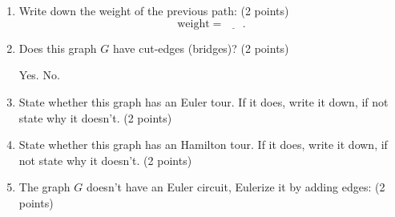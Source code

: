 \documentclass[12pt]{exam}
\begin{document}
\begin{enumerate}
\begin{enumerate}
    \vfill
    \item Write down the weight of the previous path: (2 points)
    \vspace{0.5em}
    $$\text{weight}=\underline{\phantom{ans}}.$$
    \vfill
    \item Does this graph $G$ have cut-edges (bridges)? (2 points)
    \begin{checkboxes}
        \choice Yes.
        \choice No.
    \end{checkboxes}
    \vfill
    \item State whether this graph has an Euler tour. If it does, write it down, if not state why it doesn't. (2 points)
    \vspace{8em}
    \vfill
    \item State whether this graph has an Hamilton tour. If it does, write it down, if not state why it doesn't. (2 points)
    \vspace{8em}
    \vfill
    \newpage
    \item The graph $G$ doesn't have an Euler circuit, Eulerize it by adding edges: (2 points)
    \begin{figure}[h]
        \centering
    
        \begin{tikzpicture}[x=0.75pt,y=0.75pt,yscale=-1,xscale=1]
        

\end{tikzpicture}
\end{figure}
\end{enumerate}
\end{enumerate}
\end{document}

